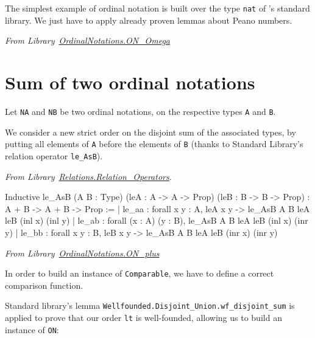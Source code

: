 The simplest example of ordinal notation is built over the type \texttt{nat} of \coq's standard library. We just have to apply already proven lemmas about Peano numbers.

\vspace{4pt}
\noindent\emph{From Library~\href{../theories/html/hydras.OrdinalNotations.ON_Omega.html}{OrdinalNotations.ON\_Omega}}



\section{Sum of  two ordinal notations}

Let \texttt{NA} and \texttt{NB} be two ordinal notations, on the respective types \texttt{A} and \texttt{B}.

 We consider a new strict order
on the disjoint sum of the associated types, by putting all elements of \texttt{A} before the elements of \texttt{B} (thanks to Standard Library's relation operator \texttt{le\_AsB}).

\vspace{4pt}
\noindent
\emph{From Library~\href{https://coq.inria.fr/distrib/current/stdlib/Coq.Relations.Relation_Operators.html}{Relations.Relation\_Operators}}.

\begin{Coqanswer}
Inductive
le_AsB (A B : Type) (leA : A -> A -> Prop) (leB : B -> B -> Prop)
  : A + B -> A + B -> Prop :=
| le_aa : forall x y : A, leA x y -> le_AsB A B leA leB (inl x) (inl y)
| le_ab : forall (x : A) (y : B), le_AsB A B leA leB (inl x) (inr y)
| le_bb : forall x y : B, leB x y -> le_AsB A B leA leB (inr x) (inr y)
\end{Coqanswer}


\vspace{4pt}
\noindent\emph{From Library~\href{../theories/html/hydras.OrdinalNotations.ON_plus.html}{OrdinalNotations.ON\_plus}}




In order to build an instance of \texttt{Comparable}, we have to define a correct comparison function.



Standard library's lemma \texttt{Wellfounded.Disjoint\_Union.wf\_disjoint\_sum} 
is applied  to prove that our order \texttt{lt} is well-founded, allowing us to build an instance of \texttt{ON}:

